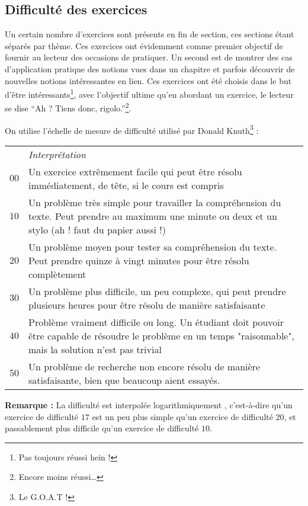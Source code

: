 \documentclass[../main.tex]{subfiles}
\begin{document}
\hrulefill

\subsection*{Difficulté des exercices}

Un certain nombre d'exercices sont présents en fin de section, ces sections étant séparés par thème. Ces exercices ont évidemment comme premier objectif de fournir au lecteur des occasions de pratiquer. Un second est de montrer des cas d'application pratique des notions vues dans un chapitre et parfois découvrir de nouvelles notions intéressantes en lien. Ces exercices ont été choisis dans le but d'être intéressants\footnote{Pas toujours réussi hein !}, avec l'objectif ultime qu'en abordant un exercice, le lecteur se dise ``Ah ? Tiens donc, rigolo.''\footnote{Encore moins réussi\dots}.

On utilise l'échelle de mesure de difficulté utilisé par Donald Knuth\footnote{Le G.O.A.T !}\cite{TAOCP} : 
\begin{center}
	\begin{tabular}{cp{}}
	& \textit{Interprétation} \\
	$00$ & Un exercice extrêmement facile qui peut être résolu immédiatement, de tête, si le cours est compris \\
	$10$ & Un problème très simple pour travailler la compréhension du texte. Peut prendre au maximum une minute ou deux et un stylo (ah ! faut du papier aussi !)\\
	$20$ & Un problème moyen pour tester sa compréhension du texte. Peut prendre quinze à vingt minutes pour être résolu complètement \\
	$30$ & Un problème plus difficile, un peu complexe, qui peut prendre plusieurs heures pour être résolu de manière satisfaisante \\
	$40$ & Problème vraiment difficile ou long. Un étudiant doit pouvoir être capable de résoudre le problème en un temps "raisonnable", mais la solution n'est pas trivial \\
	$50$ & Un problème de recherche non encore résolu de manière satisfaisante, bien que beaucoup aient essayés.
	\end{tabular}
\end{center}
\textbf{Remarque : } La difficulté est interpolée \og logarithmiquement \fg, c'est-à-dire qu'un exercice de difficulté $17$ est un peu plus simple qu'un exercice de difficulté $20$, et passablement plus difficile qu'un exercice de difficulté $10$.
\end{document}
